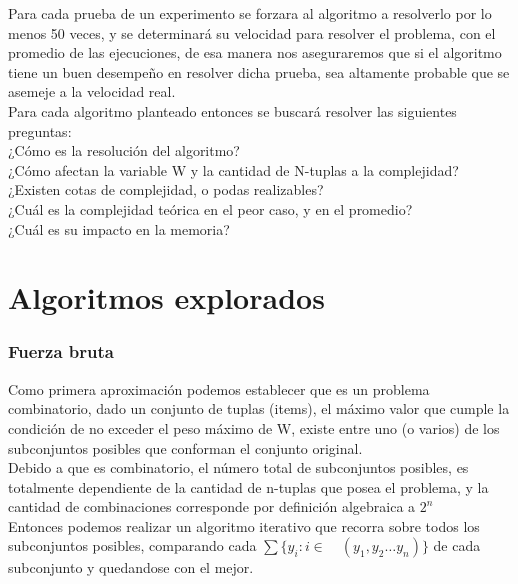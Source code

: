\documentclass[fleqn, 11pt]{article}
\begin{document}
Para cada prueba de un experimento se forzara al algoritmo a resolverlo por lo menos 50 veces, y se determinará su velocidad para resolver el problema, con el promedio de las ejecuciones, de esa manera nos aseguraremos que si el algoritmo tiene un buen desempeño en resolver dicha prueba, sea altamente probable que se asemeje a la velocidad real.  \\

Para cada algoritmo planteado entonces se buscará resolver las siguientes preguntas:\\

¿Cómo es la resolución del algoritmo?  \\
¿Cómo afectan la variable W y la cantidad de N-tuplas a la complejidad? \\
¿Existen cotas de complejidad, o podas realizables?  \\
¿Cuál es la complejidad teórica en el peor caso, y en el promedio?  \\
¿Cuál es su impacto en la memoria?  \\

\clearpage

\maketitle
\section{Algoritmos explorados}

\subsubsection{Fuerza bruta}

Como primera aproximación podemos establecer que es un problema combinatorio, dado un conjunto de tuplas (items),
el máximo valor que cumple la condición de no exceder el peso máximo de W, existe entre uno (o varios) de los
subconjuntos posibles que conforman el conjunto original. \\

Debido a que es combinatorio, el número total de subconjuntos posibles, es totalmente dependiente de la
cantidad de n-tuplas que posea el problema, y la cantidad de combinaciones corresponde por definición algebraica a $2^n$  \\

Entonces podemos realizar un algoritmo iterativo que recorra sobre todos los subconjuntos posibles, comparando cada $\sum \{ y_i : i \in  \quad (y_1, y_2 \dots y_n)\}$ de cada subconjunto y quedandose con el mejor.
\end{document}
